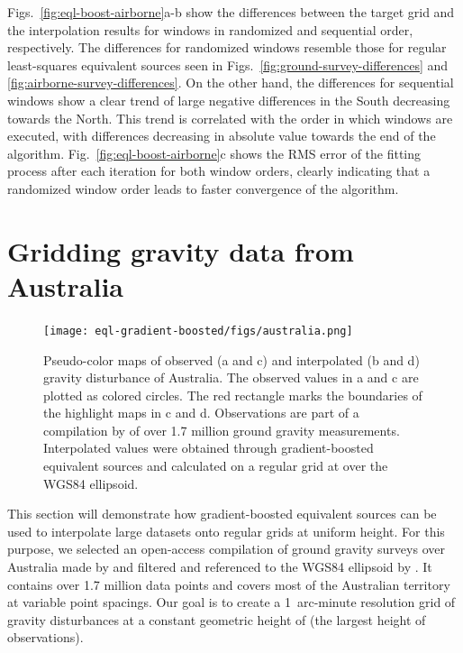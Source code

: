 Figs.~\ref{fig:eql-boost-airborne}a-b show the differences between the target
grid and the interpolation results for windows in randomized and sequential
order, respectively.
The differences for randomized windows resemble those for regular least-squares
equivalent sources seen in Figs.~\ref{fig:ground-survey-differences} and
\ref{fig:airborne-survey-differences}.
On the other hand, the differences for sequential windows show a clear
trend of large negative differences in the South decreasing towards the North.
This trend is correlated with the order in which windows are executed, with
differences decreasing in absolute value towards the end of the algorithm.
Fig.~\ref{fig:eql-boost-airborne}c shows the RMS error of the fitting process
after each iteration for both window orders, clearly indicating that
a randomized window order leads to faster convergence of the algorithm.



\section{Gridding gravity data from Australia}

\begin{figure}[p]
    \texttt{[image: eql-gradient-boosted/figs/australia.png]}
    \caption{
      Pseudo-color maps of observed (a and c) and
      interpolated (b and d) gravity disturbance of Australia.
      The observed values in a and c are plotted as colored circles.
      The red rectangle marks the boundaries of the highlight maps in c
      and d.
      Observations are part of a compilation by \citet{wynne2018} of
      over 1.7 million ground gravity measurements.
      Interpolated values were obtained through gradient-boosted equivalent
      sources and calculated on a regular grid at \AustraliaEqlGridHeight{}
      over the WGS84 ellipsoid.
    }
    \label{fig:australia}
\end{figure}

This section will demonstrate how gradient-boosted equivalent sources can be
used to interpolate large datasets onto regular grids at uniform height.
For this purpose, we selected an open-access compilation of ground gravity
surveys over Australia made by \citet{wynne2018} and filtered and referenced to
the WGS84 ellipsoid by \citet{australia_compilation}.
It contains over 1.7 million data points and covers most of the Australian
territory at variable point spacings.
Our goal is to create a 1~arc-minute resolution grid of gravity disturbances at
a constant geometric height of \AustraliaEqlGridHeight{} (the largest height of
observations).

